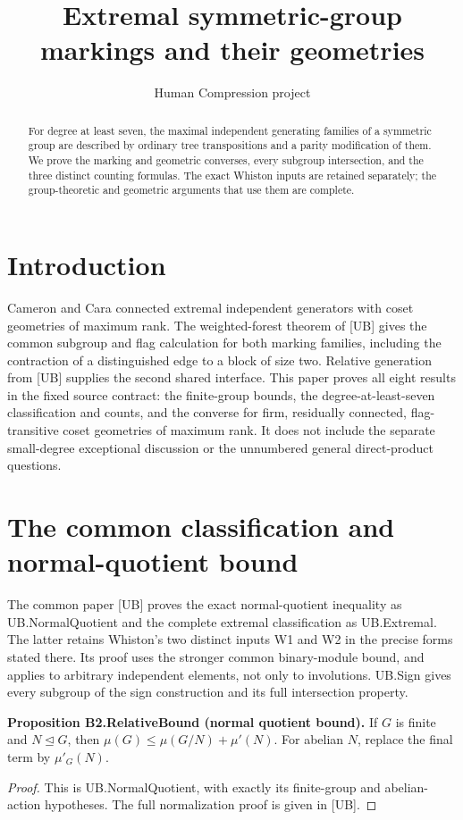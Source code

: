 
\title{Extremal symmetric-group markings and their geometries}
\author{Human Compression project}
\date{}

\maketitle
\begin{abstract}
For degree at least seven, the maximal independent generating families of a symmetric group are described by ordinary tree transpositions and a parity modification of them. We prove the marking and geometric converses, every subgroup intersection, and the three distinct counting formulas. The exact Whiston inputs are retained separately; the group-theoretic and geometric arguments that use them are complete.
\end{abstract}
\section{Introduction}
Cameron and Cara connected extremal independent generators with coset geometries of maximum rank. The weighted-forest theorem of [UB] gives the common subgroup and flag calculation for both marking families, including the contraction of a distinguished edge to a block of size two. Relative generation from [UB] supplies the second shared interface. This paper proves all eight results in the fixed source contract: the finite-group bounds, the degree-at-least-seven classification and counts, and the converse for firm, residually connected, flag-transitive coset geometries of maximum rank. It does not include the separate small-degree exceptional discussion or the unnumbered general direct-product questions.
\section{The common classification and normal-quotient bound}
The common paper [UB] proves the exact normal-quotient inequality
as UB.NormalQuotient and the complete extremal classification as
UB.Extremal. The latter retains Whiston's two distinct inputs W1 and W2
in the precise forms stated there. Its proof uses the stronger common
binary-module bound, and applies to arbitrary independent elements,
not only to involutions. UB.Sign gives every subgroup of the sign
construction and its full intersection property.

\textbf{Proposition B2.RelativeBound (normal quotient bound).}
If $G$ is finite and $N\unlhd G$, then
$\mu(G)\leq\mu(G/N)+\mu'(N)$. For abelian $N$, replace the final
term by $\mu'_G(N)$.
\begin{proof}
This is UB.NormalQuotient, with exactly its finite-group and abelian-action
hypotheses. The full normalization proof is given in [UB].
\end{proof}

